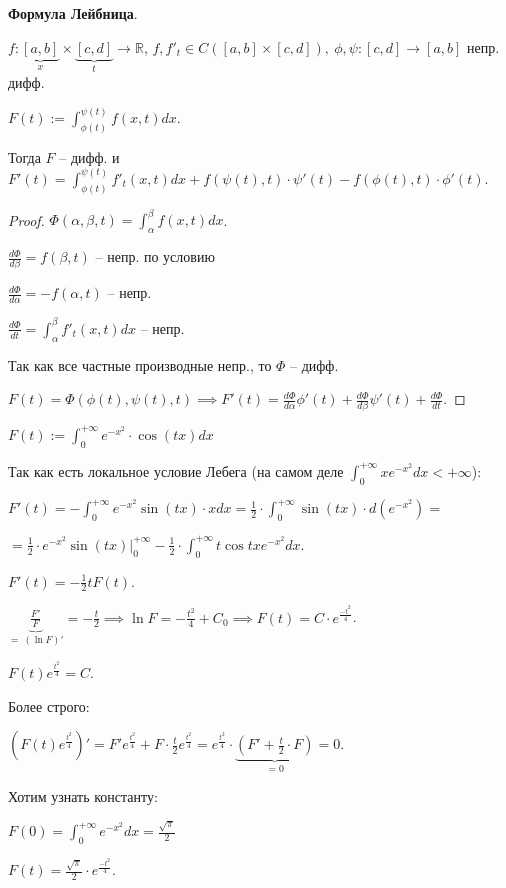 \begin{theorem}
    \textbf{Формула Лейбница}.

    $f: \underbrace{[a, b]}_{x} \times \underbrace{[c, d]}_{t} \rightarrow \mathbb{R}$, $f, f'_t \in C([a, b] \times [c, d]), \ \phi, \psi : [c, d] \rightarrow [a, b]$ непр. дифф.

    $F(t) := \int_{\phi(t)}^{\psi(t)} { f(x, t) d x }$.

    Тогда $F$ -- дифф. и $F'(t) = \int_{\phi(t)}^{\psi(t)} { f'_t (x, t) dx } + f (\psi(t), t) \cdot \psi'(t) - f(\phi(t), t) \cdot \phi'(t)$.
\end{theorem}
\begin{proof}
    $\Phi(\alpha, \beta, t) = \int_{\alpha}^{\beta} {f(x, t) d x}$.

    $\frac{d\Phi}{d \beta} = f(\beta, t)$ -- непр. по условию
    
    $\frac{d\Phi}{d \alpha} = -f(\alpha, t)$ -- непр.

    $\frac{d \Phi}{d t} = \int_{\alpha}^{\beta} {f'_t (x, t) d x}$ -- непр.

    Так как все частные производные непр., то $\Phi$ -- дифф.

    $F(t) = \Phi(\phi(t), \psi(t), t) \implies F'(t) = \frac{d \Phi}{d \alpha} \phi'(t) + \frac{d \Phi}{d \beta} \psi'(t) + \frac{d\Phi}{dt}$.
\end{proof}

\begin{example}
    $F(t) := \int_{0}^{+\infty} {e^{-x^2} \cdot \cos(tx) dx}$

    Так как есть локальное условие Лебега (на самом деле $\int_{0}^{+\infty} { x e^{-x^2} d x } < +\infty$):

    $F'(t) = -\int_{0}^{+\infty} { e^{-x^2} \sin(tx) \cdot x dx } = \frac{1}{2} \cdot \int_{0}^{+\infty} { \sin(tx) \cdot d (e^{-x^2}) } =$
    
    $= \frac{1}{2} \cdot e^{-x^2} \sin(tx) |_{0}^{+\infty} - \frac{1}{2} \cdot \int_{0}^{+\infty} { t \cos{tx} e^{-x^2} dx }$.

    $F'(t) = -\frac{1}{2} t F(t)$.
    
    $\underbrace{\frac{F'}{F}}_{= \ (\ln{F})'} = -\frac{t}{2} \implies \ln{F} = -\frac{t^2}{4} + C_0 \implies F(t) = C \cdot e^{\frac{-t^2}{4}}$.

    $F(t) e^{\frac{t^2}{4}} = C$.

    Более строго:

    $\left( F(t) e^{\frac{t^2}{4}} \right)' = F' e^{\frac{t^2}{4}} + F \cdot \frac{t}{2} e^{\frac{t^2}{4}} = e^{\frac{t^2}{4}} \cdot \underbrace{(F' + \frac{t}{2} \cdot F)}_{= 0} = 0$.

    Хотим узнать константу:

    $F(0) = \int_{0}^{+\infty} { e^{-x^2} dx } = \frac{\sqrt{\pi}}{2}$

    $F(t) = \frac{\sqrt{\pi}}{2} \cdot e^{\frac{-t^2}{4}}$.
\end{example}



